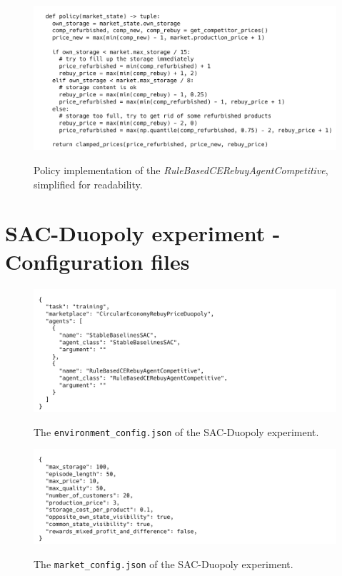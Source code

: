 \begin{figure}[!]
	\includegraphics[width = \textwidth]{images/policies/RuleBasedCERebuyAgentCompetitivePolicy.png}\\
	\caption{Policy implementation of the \emph{RuleBasedCERebuyAgentCompetitive}, simplified for readability.}\label{fig:PolicyRuleBasedCompetitive}
\end{figure}

\clearpage
\section{SAC-Duopoly experiment - Configuration files}\label{sec:AppendixConfigFiles}

\begin{figure}[ht]
	\includegraphics[width = \textwidth]{images/configs/SACDuopolyEnvironment.png}\\
	\caption{The \texttt{environment\_config.json} of the SAC-Duopoly experiment.}\label{fig:SACDuopolyConfigEnvironment}
\end{figure}

\begin{figure}[ht]
	\includegraphics[width = \textwidth]{images/configs/SACDuopolyMarket.png}\\
	\caption{The \texttt{market\_config.json} of the SAC-Duopoly experiment.}\label{fig:SACDuopolyConfigMarket}
\end{figure}

